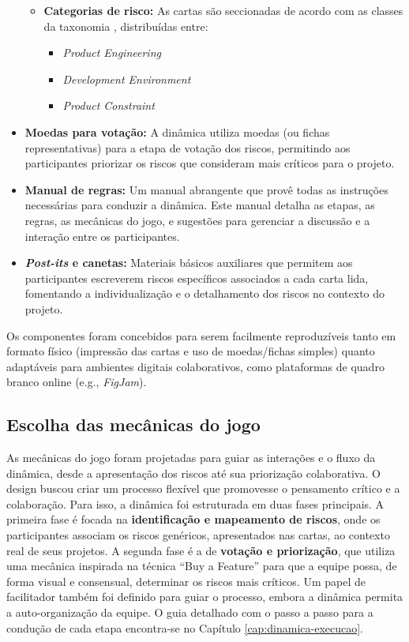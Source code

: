 \documentclass[
	12pt,
	openright,
	twoside,
	a4paper,
	english,
	brazil
	]{abntex2}
\begin{document}
\begin{itemize}
\begin{itemize}
    \item \textbf{Categorias de risco:} As cartas são seccionadas de acordo com as classes da taxonomia \cite{Taxonomy}, distribuídas entre:
    \begin{itemize}
      \item \textit{Product Engineering}
      \item \textit{Development Environment}
      \item \textit{Product Constraint}
    \end{itemize}
  \end{itemize}

  \item \textbf{Moedas para votação:} A dinâmica utiliza moedas (ou fichas representativas) para a etapa de votação dos riscos, permitindo aos participantes priorizar os riscos que consideram mais críticos para o projeto. 

  \item \textbf{Manual de regras:} Um manual abrangente que provê todas as instruções necessárias para conduzir a dinâmica. Este manual detalha as etapas, as regras, as mecânicas do jogo, e sugestões para gerenciar a discussão e a interação entre os participantes. 

  \item \textbf{\textit{Post-its} e canetas:} Materiais básicos auxiliares que permitem aos participantes escreverem riscos específicos associados a cada carta lida, fomentando a individualização e o detalhamento dos riscos no contexto do projeto. 
\end{itemize}

Os componentes foram concebidos para serem facilmente reproduzíveis tanto em formato físico (impressão das cartas e uso de moedas/fichas simples) quanto adaptáveis para ambientes digitais colaborativos, como plataformas de quadro branco online (e.g., \textit{FigJam}). 

\subsection{Escolha das mecânicas do jogo}
\label{sec:escolha-mecanicas}

As mecânicas do jogo foram projetadas para guiar as interações e o fluxo da dinâmica, desde a apresentação dos riscos até sua priorização colaborativa. O design buscou criar um processo flexível que promovesse o pensamento crítico e a colaboração. Para isso, a dinâmica foi estruturada em duas fases principais. A primeira fase é focada na \textbf{identificação e mapeamento de riscos}, onde os participantes associam os riscos genéricos, apresentados nas cartas, ao contexto real de seus projetos. A segunda fase é a de \textbf{votação e priorização}, que utiliza uma mecânica inspirada na técnica “Buy a Feature” para que a equipe possa, de forma visual e consensual, determinar os riscos mais críticos. Um papel de facilitador também foi definido para guiar o processo, embora a dinâmica permita a auto-organização da equipe. O guia detalhado com o passo a passo para a condução de cada etapa encontra-se no Capítulo \ref{cap:dinamica-execucao}.
\end{document}
